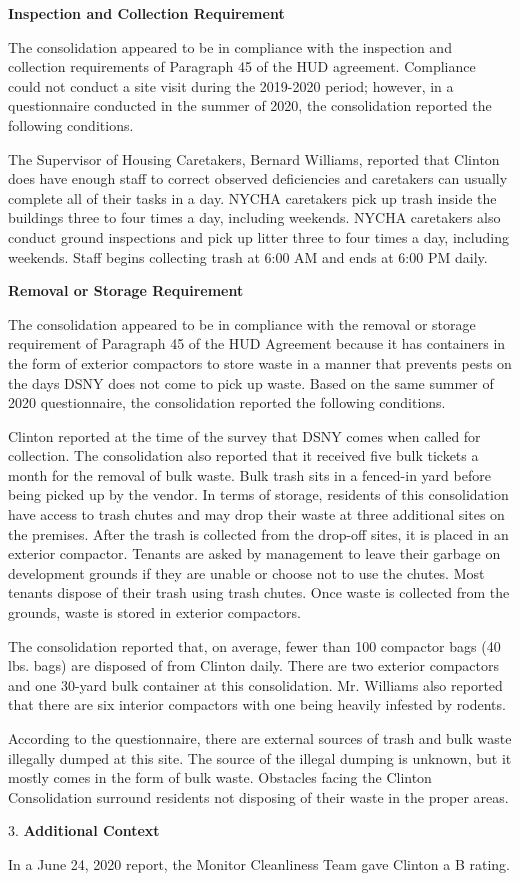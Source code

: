 
\textbf{Inspection and Collection Requirement}

The consolidation appeared to be in compliance with the inspection and collection requirements of Paragraph 45 of the HUD agreement. Compliance could not conduct a site visit during the 2019-2020 period; however, in a questionnaire conducted in the summer of 2020, the consolidation reported the following conditions.

The Supervisor of Housing Caretakers, Bernard Williams, reported that Clinton does have enough staff to correct observed deficiencies and caretakers can usually complete all of their tasks in a day. NYCHA caretakers pick up trash inside the buildings three to four times a day, including weekends. NYCHA caretakers also conduct ground inspections and pick up litter three to four times a day, including weekends. Staff begins collecting trash at 6:00 AM and ends at 6:00 PM daily. 

\textbf{Removal or Storage Requirement}

The consolidation appeared to be in compliance with the  removal or storage requirement of Paragraph  45 of the HUD Agreement because it has containers in the form of exterior compactors to store waste in a manner that prevents pests on the days DSNY does not come to pick up waste. Based on the same summer of  2020 questionnaire, the consolidation reported the following conditions.

Clinton reported at the time of the survey that DSNY comes when called for collection. The consolidation also reported that it received five bulk tickets a month for the removal of bulk waste. Bulk trash sits in a fenced-in yard before being picked up by the vendor. In terms of storage, residents of this consolidation have access to trash chutes and may drop their waste at three additional sites on the premises. After the trash is collected from the drop-off sites, it is placed in an exterior compactor. Tenants are asked by management to leave their garbage on development grounds if they are unable or choose not to use the chutes. Most tenants dispose of their trash using trash chutes. Once waste is collected from the grounds, waste is stored in exterior compactors. 

The consolidation reported that, on average, fewer than 100 compactor bags (40 lbs. bags)  are disposed of from Clinton daily. There are two exterior compactors and one 30-yard bulk container at this consolidation. Mr. Williams also reported that there are six interior compactors with one being heavily infested by rodents.

 According to the questionnaire, there are external sources of trash and bulk waste illegally dumped at this site. The source of the illegal dumping is unknown, but it mostly comes in the form of bulk waste. Obstacles facing the Clinton Consolidation surround residents not disposing of their waste in the proper areas.

3. \textbf{Additional Context} 

In a June 24, 2020 report, the Monitor Cleanliness Team gave Clinton a B rating. 